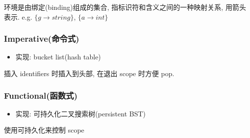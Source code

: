 环境是由绑定(binding)组成的集合, 指标识符和含义之间的一种映射关系, 用箭头表示. e.g. $\{g\to string\}$, $\{a\to int\}$

\subsubsection{Imperative(命令式)}
\begin{itemize}
    \item 实现: bucket list(hash table)
\end{itemize}
插入 identifiers 时插入到头部, 在退出 scope 时方便 pop. 

\subsubsection{Functional(函数式)}
\begin{itemize}
    \item 实现: 可持久化二叉搜索树(persistent BST)
\end{itemize}
使用可持久化来控制 scope